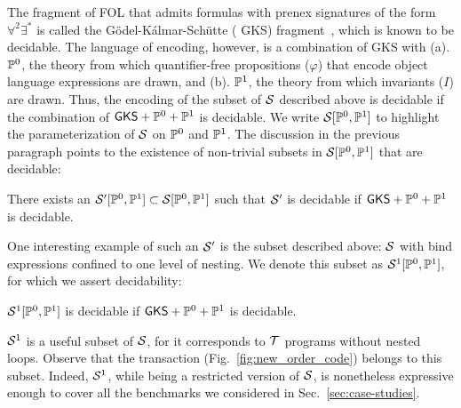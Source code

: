 The fragment of FOL that admits formulas with prenex signatures of the
form $\forall^2\exists^*$ is called the G\"odel-K\'almar-Sch\"utte ({\sf
GKS}) fragment~\cite{gks}, which is known to be decidable. The
language of encoding, however, is a combination of {\sf GKS} with (a).
$\mathbb{P}^0$, the theory from which quantifier-free propositions
($\varphi$) that encode object language expressions are drawn, and
(b). $\mathbb{P}^1$, the theory from which invariants ($I$) are drawn. Thus,
the encoding of the subset of $\mathcal{S}$ described above is decidable if the
combination of ${\sf GKS} + \mathbb{P}^0 + \mathbb{P}^1$ is decidable. We write
$\mathcal{S}[\mathbb{P}^0,\mathbb{P}^1]$ to highlight the parameterization of $\mathcal{S}$ on
$\mathbb{P}^0$ and $\mathbb{P}^1$.  The discussion in the previous paragraph
points to the existence of non-trivial subsets in $\mathcal{S}[\mathbb{P}^0,\mathbb{P}^1]$ that are
decidable:
\begin{theorem}
  There exists an $\mathcal{S}'[\mathbb{P}^0,\mathbb{P}^1] \subset \mathcal{S}[\mathbb{P}^0,\mathbb{P}^1]$
  such that $\mathcal{S}'$ is decidable if ${\sf GKS}+\mathbb{P}^0+\mathbb{P}^1$ is
  decidable.
\end{theorem}
One interesting example of such an $\mathcal{S}'$ is the subset described above: $\mathcal{S}$ with
bind expressions confined to one level of nesting. We denote this
subset as $\mathcal{S}^1[\mathbb{P}^0,\mathbb{P}^1]$, for which we assert decidability:
\begin{corollary}
  $\mathcal{S}^1[\mathbb{P}^0,\mathbb{P}^1]$ is decidable if ${\sf GKS}+\mathbb{P}^0+\mathbb{P}^1$ is
  decidable.
\end{corollary}
$\mathcal{S}^1$ is a useful subset of $\mathcal{S}$, for it corresponds to $\mbox{${\mathcal T}$}$
programs without nested  loops. Observe that the
 transaction (Fig.~\ref{fig:new_order_code}) belongs to
this subset.  Indeed, $\mathcal{S}^1$, while being a restricted version of
$\mathcal{S}$, is nonetheless expressive enough to cover all the benchmarks we
considered in Sec.~\ref{sec:case-studies}.

